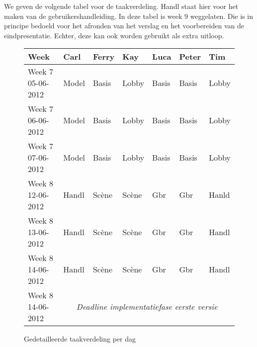 \documentclass[a4paper,11pt]{article}
\begin{document}
    We geven de volgende tabel voor de taakverdeling. Handl staat hier voor het maken van de gebruikershandleiding. In deze tabel is week 9 weggelaten. Die is in principe bedoeld voor het afronden van het verslag en het voorbereiden van de eindpresentatie. Echter, deze kan ook worden gebruikt als extra uitloop.
   \begin{figure}[H]
        \small
        \centering
        \begin{tabular}{| l | l | l | l | l | l | l |}
        \hline
        Week & Carl & Ferry & Kay & Luca & Peter & Tim \\ \hline
        Week 7 05-06-2012 & Model & Basis & Lobby & Basis & Basis & Lobby \\ \hline
        Week 7 06-06-2012 & Model & Basis & Lobby & Basis & Basis & Lobby \\ \hline
        Week 7 07-06-2012 & Model & Basis & Lobby & Basis & Basis & Lobby \\ \hline
        Week 8 12-06-2012 & Handl & Sc\`ene & Sc\`ene & Gbr & Gbr & Hanld \\ \hline
        Week 8 13-06-2012 & Handl & Sc\`ene & Sc\`ene & Gbr & Gbr & Handl \\ \hline
        Week 8 14-06-2012 & Handl & Sc\`ene & Sc\`ene & Gbr & Gbr & Handl \\ \hline
        Week 8 14-06-2012 & \multicolumn{6}{|c|}{\emph{Deadline implementatiefase eerste versie}} \\ \hline
        \end{tabular}
        \caption{Gedetailleerde taakverdeling per dag}
        \label{tab:planning}
    \end{figure}
\end{document}
